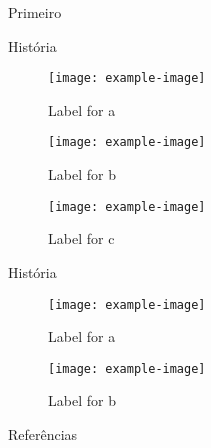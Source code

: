 \documentclass[portuguese,10pt]{beamer}
\begin{document}
\begin{frame}{Primeiro}
    
\end{frame}









\begin{frame}{História}
    \begin{figure}[ht]
        \begin{minipage}[b]{0.32\linewidth}
            \centering
            \texttt{[image: example-image]}
            \caption{Label for a}
            \label{fig:3a}
        \end{minipage}
        \hspace{\fill}
        \begin{minipage}[b]{0.32\linewidth}
            \centering
            \texttt{[image: example-image]}
            \caption{Label for b}
            \label{fig:3b}
        \end{minipage}
        \hspace{\fill}
        \begin{minipage}[b]{0.32\linewidth}
            \centering
            \texttt{[image: example-image]}
            \caption{Label for c}
            \label{fig:3c}
        \end{minipage}
    \end{figure}
\end{frame}

\begin{frame}{História}
    \begin{figure}[ht]
        \begin{minipage}[b]{0.49\linewidth}
            \centering
            \texttt{[image: example-image]}
            \caption{Label for a}
            \label{fig:2a}
        \end{minipage}
        \hspace{\fill}
        \begin{minipage}[b]{0.49\linewidth}
            \centering
            \texttt{[image: example-image]}
            \caption{Label for b}
            \label{fig:2b}
        \end{minipage}
    \end{figure}
\end{frame}

\begin{frame}{Referências}
  \printbibliography
\end{frame}
\end{document}
